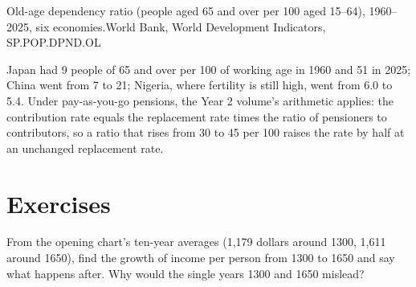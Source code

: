 \begin{omchart}{Old-age dependency ratio (people aged 65 and over per 100 aged 15--64),
1960--2025, six economies.}{World Bank, World Development Indicators, SP.POP.DPND.OL}
\end{omchart}

Japan had 9 people of 65 and over per 100 of working age in 1960 and 51 in 2025; China went from 7 to 21; Nigeria,
where fertility is still high, went from 6.0 to 5.4. Under pay-as-you-go pensions, the Year 2
volume's arithmetic applies: the contribution rate equals the replacement rate
times the ratio of pensioners to contributors, so a ratio that rises from 30 to 45 per 100 raises the
rate by half at an unchanged replacement rate.

\section{Exercises}\label{sec:b3:demographic-transition:exercises}

\begin{exercise}[$\star$]\label{exo:b3:demographic-transition:1}
From the opening chart's ten-year averages (1{,}179 dollars around 1300, 1{,}611 around
1650), find the growth of income per person from 1300 to 1650 and say what happens after.
Why would the single years 1300 and 1650 mislead?
\end{exercise}

